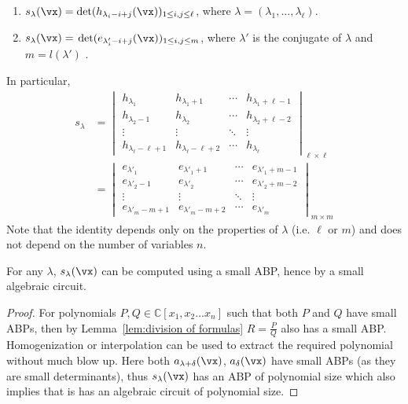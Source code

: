 %
\begin{theorem} \label {thm:jacobi-trudi}  \leavevmode
	
	\begin{enumerate}
		\item[(1)] $s_\lambda(\vx)=\det(h_{\lambda_i -i+j}(\vx))_{1\leq i,j \leq \ell}$, where $\lambda= (\lambda_1, \ldots, \lambda_\ell)$.
		
		\item[(2)] $s_\lambda(\vx)=$ $\det(e_{\lambda'_i -i+j}(\vx))_{1\leq i,j \leq m}$,  where $\lambda'$ is the conjugate of $\lambda$ and $m= l(\lambda')$ . 
	\end{enumerate} 
	In particular, 
	\vspace{0.3cm}
\begin{align*}
s_\lambda &=  \begin{vmatrix}h_{\lambda_1}&h_{\lambda_1+1}&\cdots&h_{\lambda_1+\ell-1}\\h_{\lambda_2-1}&h_{\lambda_2}&\cdots&h_{\lambda_2+\ell-2}\\\vdots&\vdots&\ddots&\vdots\\h_{\lambda_\ell-\ell+1}&h_{\lambda_\ell-\ell+2}&\cdots&h_{\lambda_\ell}\end{vmatrix}_{\ell \times \ell} \\
	&= \begin{vmatrix}e_{\lambda'_1}&e_{\lambda'_1+1}&\cdots&e_{\lambda'_1+m-1}\\e_{\lambda'_2-1}&e_{\lambda'_2}&\cdots&e_{\lambda'_2+m-2}\\\vdots&\vdots&\ddots&\vdots\\e_{\lambda'_m-m+1}&e_{\lambda'_m-m+2}&\cdots&e_{\lambda'_m}\end{vmatrix}_{m\times m}
\end{align*}
Note that the identity depends only on the properties of $\lambda$ (i.e. $\ell$ or $m$) and does not depend on the number of variables $n$. 
\end{theorem}

%
\begin{theorem}
For any $\lambda$, $s_\lambda(\vx)$ can be computed using a small ABP, hence by a small algebraic circuit.
\end{theorem} 

\begin{proof}
For polynomials $P,Q \in \mathbb{C}[x_1,x_2 \ldots x_n]$ such that both $P$ and $Q$ have small ABPs, then by Lemma~\ref{lem:division of formulas} $R=\frac{P}{Q}$ also has a small ABP. Homogenization or interpolation can be used to extract the required polynomial without much blow up. Here both $a_{\lambda+\delta}(\vx)$, $a_\delta(\vx)$ have small ABPs (as they are small determinants), thus $s_\lambda(\vx)$ has an ABP of polynomial size which also implies that is has an algebraic circuit of polynomial size.
\end{proof}

